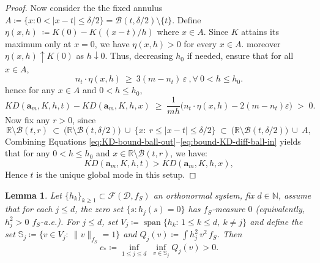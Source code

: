 \documentclass[
  12pt]{article}
\newcommand{\calD}{\mathcal{D}}
\newcommand{\calF}{\mathcal{F}}
\newcommand{\R}{\mathbb{R}}
\newcommand{\ba}{\boldsymbol{a}}
\newtheorem{lemma}{Lemma}
\begin{document}
\begin{proof}
Now consider the the fixed annulus $A \coloneqq \{x:0<|x-t|\le\delta/2\} = \mathcal B(t,\delta/2)\setminus \{t\}$.
Define $\eta(x,h)\ \coloneqq K(0)-K((x-t)/h)$ where $x \in A$. Since $K$ attains its maximum only at $x=0$, we have $\eta(x,h)>0$ for every $x \in A$. moreover $\eta(x,h)\uparrow K(0)$ as $h\downarrow 0$.
Thus, decreasing $h_0$ if needed, ensure that for all $x \in A$,
\begin{equation}\label{eq:bound-KD}
    n_t\cdot\eta(x,h)\ \ge\ 3(m-n_t)\,\varepsilon\ ,\forall\ 0<h\le h_0.
\end{equation}
hence for any $x\in A$ and $0<h\le h_0$,
\begin{equation}\label{eq:bound-KD-diff-ball-in}
    KD(\ba_m,K,h,t)-KD(\ba_m,K,h,x)
\;\ge\; \frac{1}{mh}\Big(n_t \cdot \eta(x,h) - 2(m-n_t)\varepsilon\Big)\;>\;0.
\end{equation}
Now fix any $r>0$, since
$$
\R\setminus\mathcal B(t,r)\ \subset\
\big(\R\setminus\mathcal B(t,\delta/2)\big)\ \cup\ \{x:\ r\le |x-t|\le \delta/2\}\ \subset\
\big(\R\setminus\mathcal B(t,\delta/2)\big)\ \cup\ A,
$$
Combining Equations \ref{eq:KD-bound-ball-out}--\ref{eq:bound-KD-diff-ball-in} yields that for any $0<h\le h_0$ and $x\in \R \setminus \mathcal B(t,r)$, we have:
$$
KD(\ba_m,K,h,t) > KD(\ba_m,K,h,x),
$$
Hence $t$ is the unique global mode in this setup. 
\end{proof}
\begin{lemma}\label{lem:non-zero-proj}
Let $\{h_k\}_{k\ge1}\subset \calF(\calD,f_S)$ an orthonormal system, fix $d\in\mathbb N$, assume that for each $j\le d$, the zero set $\{s: h_j(s)=0\}$ has $f_S$-measure $0$
(equivalently, $h_j^2>0$ $f_S$-a.e.).
For $j\le d$, set $V_j\coloneqq\operatorname{span}\{h_k:\,1\le k\le d,\ k\neq j\}$ and define the set $\mathbb S_j\coloneqq\{v\in V_j:\ \|v\|_{f_S}=1\}$ and $Q_j(v)\coloneqq\int h_j^2\,v^2\,f_S$. Then
$$
c_\ast \coloneqq \inf_{1\le j\le d}\ \inf_{v\in \mathbb S_j} Q_j(v) > 0.
$$
\end{lemma}
\end{document}
